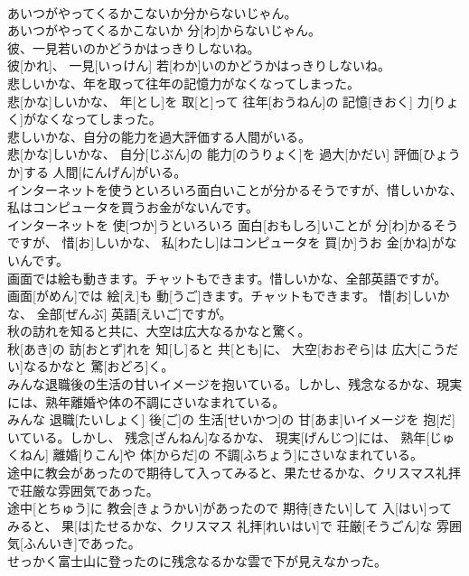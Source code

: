\documentclass[8pt]{extreport}
\begin{document}
\begin{CJK}{UTF8}{min}
\\	あいつがやってくるかこないか分からないじゃん。	
\\	あいつがやってくるかこないか 分[わ]からないじゃん。
\\	彼、一見若いのかどうかはっきりしないね。	
\\	彼[かれ]、 一見[いっけん] 若[わか]いのかどうかはっきりしないね。
\\	悲しいかな、年を取って往年の記憶力がなくなってしまった。	
\\	悲[かな]しいかな、 年[とし]を 取[と]って 往年[おうねん]の 記憶[きおく] 力[りょく]がなくなってしまった。
\\	悲しいかな、自分の能力を過大評価する人間がいる。	
\\	悲[かな]しいかな、 自分[じぶん]の 能力[のうりょく]を 過大[かだい] 評価[ひょうか]する 人間[にんげん]がいる。
\\	インターネットを使うといろいろ面白いことが分かるそうですが、惜しいかな、私はコンピュータを買うお金がないんです。	
\\	インターネットを 使[つか]うといろいろ 面白[おもしろ]いことが 分[わ]かるそうですが、 惜[お]しいかな、 私[わたし]はコンピュータを 買[か]うお 金[かね]がないんです。
\\	画面では絵も動きます。チャットもできます。惜しいかな、全部英語ですが。	
\\	画面[がめん]では 絵[え]も 動[うご]きます。チャットもできます。 惜[お]しいかな、 全部[ぜんぶ] 英語[えいご]ですが。
\\	秋の訪れを知ると共に、大空は広大なるかなと驚く。	
\\	秋[あき]の 訪[おとず]れを 知[し]ると 共[とも]に、 大空[おおぞら]は 広大[こうだい]なるかなと 驚[おどろ]く。
\\	みんな退職後の生活の甘いイメージを抱いている。しかし、残念なるかな、現実には、熟年離婚や体の不調にさいなまれている。	
\\	みんな 退職[たいしょく] 後[ご]の 生活[せいかつ]の 甘[あま]いイメージを 抱[だ]いている。しかし、 残念[ざんねん]なるかな、 現実[げんじつ]には、 熟年[じゅくねん] 離婚[りこん]や 体[からだ]の 不調[ふちょう]にさいなまれている。
\\	途中に教会があったので期待して入ってみると、果たせるかな、クリスマス礼拝で荘厳な雰囲気であった。	
\\	途中[とちゅう]に 教会[きょうかい]があったので 期待[きたい]して 入[はい]ってみると、 果[は]たせるかな、クリスマス 礼拝[れいはい]で 荘厳[そうごん]な 雰囲気[ふんいき]であった。
\\	せっかく富士山に登ったのに残念なるかな雲で下が見えなかった。	

\end{CJK}
\end{document}
